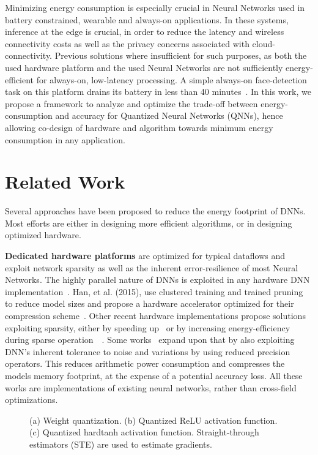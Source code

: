 \documentclass[article,10pt]{IEEEtran}
\begin{document}
Minimizing energy consumption is especially crucial in Neural Networks used in battery constrained, wearable and always-on applications. In these systems, inference at the edge is crucial, in order to reduce the latency and wireless connectivity costs as well as the privacy concerns associated with cloud-connectivity. Previous solutions where insufficient for such purposes, as both the used hardware platform and the used Neural Networks are not sufficiently energy-efficient for always-on, low-latency processing. A simple always-on face-detection task on this platform drains its battery in less than 40 minutes~\cite{likamwa2014draining}. In this work, we propose a framework to analyze and optimize the trade-off between energy-consumption and accuracy for Quantized Neural Networks (QNNs), hence allowing co-design of hardware and algorithm towards minimum energy consumption in any application.


\section{Related Work}
\label{sec:related_work}
Several approaches have been proposed to reduce the energy footprint of DNNs. Most efforts are either in designing more efficient algorithms, or in designing optimized hardware.

\textbf{Dedicated hardware platforms} are optimized for typical dataflows and exploit network sparsity as well as the inherent error-resilience of most Neural Networks. The highly parallel nature of DNNs is exploited in any hardware DNN implementation~\cite{moons2017envision,chen2016eyeriss}. Han, et al. (2015), use clustered training and trained pruning to reduce model sizes and propose a hardware accelerator optimized for their compression scheme~\cite{han2016eie}. Other recent hardware implementations propose solutions exploiting sparsity, either by speeding up~\cite{kim2017anovel} or by increasing energy-efficiency during sparse operation~\cite{chen2016eyeriss}~\cite{moons2017envision}. Some works~\cite{moons2017envision,han2016eie} expand upon that by also exploiting DNN's inherent tolerance to noise and variations by using reduced precision operators. This reduces arithmetic power consumption and compresses the models memory footprint, at the expense of a potential accuracy loss. All these works are implementations of existing neural networks, rather than cross-field optimizations.

\begin{figure*}[t]
     \centering
     \hfill
     \hfill
     \caption{(a) Weight quantization. (b) Quantized ReLU activation function. (c) Quantized hardtanh activation function. Straight-through estimators (STE) are used to estimate gradients. }
     \label{steady_state}
\end{figure*}
\end{document}

